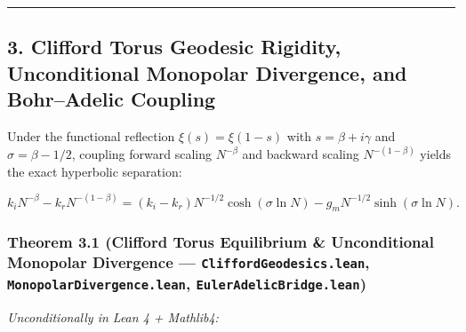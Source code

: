 \documentclass[
  11pt,
]{article}
\begin{document}
\begin{center}\rule{0.5\linewidth}{0.5pt}\end{center}

\subsection{3. Clifford Torus Geodesic Rigidity, Unconditional Monopolar
Divergence, and Bohr--Adelic
Coupling}\label{clifford-torus-geodesic-rigidity-unconditional-monopolar-divergence-and-bohradelic-coupling}

Under the functional reflection \(\xi(s) = \xi(1-s)\) with
\(s = \beta + i\gamma\) and \(\sigma = \beta - 1/2\), coupling forward
scaling \(N^{-\beta}\) and backward scaling \(N^{-(1-\beta)}\) yields
the exact hyperbolic separation:

\[k_i N^{-\beta} - k_r N^{-(1-\beta)} = (k_i - k_r) N^{-1/2}\cosh(\sigma \ln N) - g_m N^{-1/2}\sinh(\sigma \ln N).\]

\subsubsection{\texorpdfstring{Theorem 3.1 (Clifford Torus Equilibrium
\& Unconditional Monopolar Divergence ---
\texttt{CliffordGeodesics.lean}, \texttt{MonopolarDivergence.lean},
\texttt{EulerAdelicBridge.lean})}{Theorem 3.1 (Clifford Torus Equilibrium \& Unconditional Monopolar Divergence --- CliffordGeodesics.lean, MonopolarDivergence.lean, EulerAdelicBridge.lean)}}\label{theorem-3.1-clifford-torus-equilibrium-unconditional-monopolar-divergence-cliffordgeodesics.lean-monopolardivergence.lean-euleradelicbridge.lean}

\emph{Unconditionally in Lean 4 + Mathlib4:}
\end{document}
